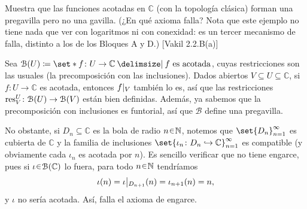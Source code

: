 \begin{ejer}\label{ejer:t3-funciones-acotadas}
Muestra que las funciones acotadas en $\mathbb C$ (con la topología clásica) forman una pregavilla pero no una gavilla. (¿En qué axioma falla? Nota que este ejemplo no tiene nada que ver con logaritmos ni con conexidad: es un tercer mecanismo de falla, distinto a los de los Bloques A y D.) \hfill [Vakil 2.2.B(a)]
\end{ejer}
\begin{sol}
Sea $\mathcal B(U)\coloneq\set*{f\colon U\to\mathbb C\given f\text{ es acotada}}$, cuyas restricciones son las usuales (la precomposición con las inclusiones). Dados abiertos $V\subseteq U\subseteq\mathbb C$, si $f\colon U\to\mathbb C$ es acotada, entonces $\restr{f}{V}$ también lo es, así que las restricciones $\operatorname{res}_V^U\colon\mathcal B(U)\to\mathcal B(V)$ están bien definidas. Además, ya sabemos que la precomposición con inclusiones es funtorial, así que $\mathcal B$ define una pregavilla.

No obstante, si $D_n\subseteq\mathbb C$ es la bola de radio $n\en\mathbb N$, notemos que $\set{D_n}_{n=1}^{\infty}$ es cubierta de $\mathbb C$ y la familia de inclusiones $\set{\iota_n\colon D_n\hookrightarrow\mathbb C}_{n=1}^{\infty}$ es compatible (y obviamente cada $\iota_n$ es acotada por $n$). Es sencillo verificar que no tiene engarce, pues si $\iota\en\mathcal B(\mathbb C)$ lo fuera, para todo $n\en\mathbb N$ tendríamos
\[
\iota(n)=\restr{\iota}{D_{n+1}}(n)=\iota_{n+1}(n)=n,
\]
y $\iota$ no sería acotada. Así, falla el axioma de engarce.
\end{sol}
